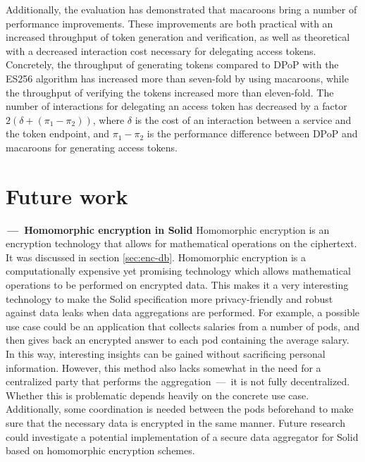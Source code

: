 Additionally, the evaluation has demonstrated that macaroons bring a number of performance improvements. These improvements are both practical with an increased throughput of token generation and verification, as well as theoretical with a decreased interaction cost necessary for delegating access tokens. Concretely, the throughput of generating tokens compared to \gls{DPoP} with the ES256 algorithm has increased more than seven-fold by using macaroons, while the throughput of verifying the tokens increased more than eleven-fold. The number of interactions for delegating an access token has decreased by a factor $2(\delta + (\pi_1 - \pi_2))$, where $\delta$ is the cost of an interaction between a service and the token endpoint, and $\pi_1 - \pi_2$ is the performance difference between \gls{DPoP} and macaroons for generating access tokens.


\section{Future work}
\label{sec:future-work}
\begin{futurework}\label{fw:homomorphic-encryption}
\textbf{\,---\, Homomorphic encryption in Solid} Homomorphic encryption is an encryption technology that allows for mathematical operations on the ciphertext. It was discussed in section \ref{sec:enc-db}. Homomorphic encryption is a computationally expensive yet promising technology which allows mathematical operations to be performed on encrypted data. This makes it a very interesting technology to make the Solid specification more privacy-friendly and robust against data leaks when data aggregations are performed. For example, a possible use case could be an application that collects salaries from a number of pods, and then gives back an encrypted answer to each pod containing the average salary. In this way, interesting insights can be gained without sacrificing personal information. However, this method also lacks somewhat in the need for a centralized party that performs the aggregation \,---\, it is not fully decentralized. Whether this is problematic depends heavily on the concrete use case. Additionally, some coordination is needed between the pods beforehand to make sure that the necessary data is encrypted in the same manner. Future research could investigate a potential implementation of a secure data aggregator for Solid based on homomorphic encryption schemes.
\end{futurework}

